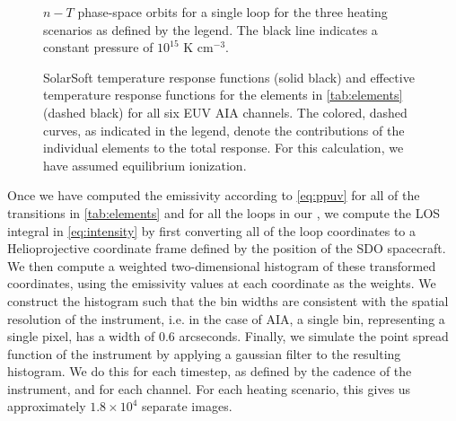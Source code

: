 \begin{figure}
    \caption{$n-T$ phase-space orbits for a single loop for the three heating scenarios as defined by the legend. The black line indicates a constant pressure of $10^{15}$ K cm$^{-3}$. }
    \label{fig:nt_phase_space}
\end{figure}

\begin{figure*}
    \caption{SolarSoft temperature response functions (solid black) and effective temperature response functions for the elements in \autoref{tab:elements} (dashed black) for all six EUV AIA channels. The colored, dashed curves, as indicated in the legend, denote the contributions of the individual elements to the total response. For this calculation, we have assumed equilibrium ionization. }
    \label{fig:aia_response}
\end{figure*}

Once we have computed the emissivity according to \autoref{eq:ppuv} for all of the transitions in \autoref{tab:elements} and for all the loops in our \AR{}, we compute the LOS integral in \autoref{eq:intensity} by first converting all of the loop coordinates to a Helioprojective coordinate frame defined by the position of the SDO spacecraft. We then compute a weighted two-dimensional histogram of these transformed coordinates, using the emissivity values at each coordinate as the weights. We construct the histogram such that the bin widths are consistent with the spatial resolution of the instrument, i.e. in the case of AIA, a single bin, representing a single pixel, has a width of 0.6 arcseconds. Finally, we simulate the point spread function of the instrument by applying a gaussian filter to the resulting histogram. We do this for each timestep, as defined by the cadence of the instrument, and for each channel. For each heating scenario, this gives us approximately $1.8\times10^4$ separate images.
